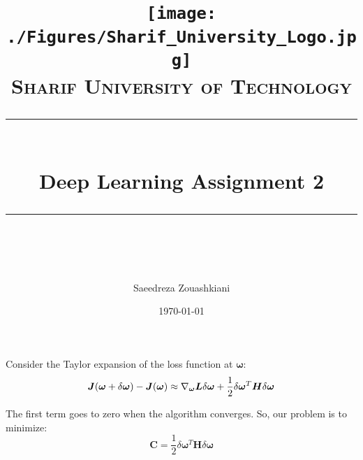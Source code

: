 \documentclass[11pt]{scrartcl} %
\title{	
	\texttt{[image: ./Figures/Sharif\_University\_Logo.jpg]}\\
	\normalfont\normalsize
	\textsc{Sharif University of Technology}\\ %
	\vspace{25pt} %
	\rule{\linewidth}{0.5pt}\\ %
	\vspace{20pt} %
	{\huge Deep Learning Assignment 2}\\ %
	\vspace{12pt} %
	\rule{\linewidth}{2pt}\\ %
	\vspace{12pt} %
}
\author{\LARGE Saeedreza Zouashkiani} %
\date{\normalsize\today} %
\begin{document}
\maketitle %

\section{} %


	\subsection{}
		Consider the Taylor expansion of the loss function at $\boldsymbol\omega$:
		\begin{equation} 
			\boldsymbol{J}(\boldsymbol{\omega}+ \delta\boldsymbol\omega) - \\
			\boldsymbol{J}(\boldsymbol{\omega}) \approx \\
			\nabla_{\boldsymbol\omega}\boldsymbol{L}\delta\boldsymbol{\omega} + \\
			\frac{1}{2}\delta\boldsymbol{\omega}^T\boldsymbol{H}\delta\boldsymbol{\omega} 
		\end{equation}

		The first term goes to zero when the algorithm converges. So, our problem is to minimize:
		\begin{equation}\label{eq:1}
			\boldsymbol{C} = \frac{1}{2}\delta\boldsymbol{\omega}^T\boldsymbol{H}\delta\boldsymbol{\omega}
		\end{equation}
\end{document}

